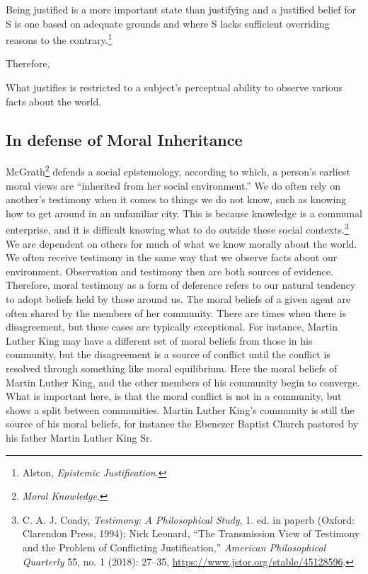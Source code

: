 \documentclass[
  12pt,
]{book}
\theoremstyle{definition}
\theoremstyle{definition}
\theoremstyle{definition}
\theoremstyle{definition}
\theoremstyle{remark}
\begin{document}
Being justified is a more important state than justifying and a justified belief for S is one based on adequate grounds and where S lacks sufficient overriding reasons to the contrary.\footnote{Alston, \emph{Epistemic Justification}.}

Therefore,

What justifies is restricted to a subject's perceptual ability to observe various facts about the world.

\subsection*{In defense of Moral Inheritance}\label{in-defense-of-moral-inheritance}

McGrath\footnote{\emph{Moral {Knowledge}}.} defends a social epistemology, according to which, a person's earliest moral views are ``inherited from her social environment.'' We do often rely on another's testimony when it comes to things we do not know, such as knowing how to get around in an unfamiliar city. This is because knowledge is a communal enterprise, and it is difficult knowing what to do outside these social contexts.\footnote{C. A. J. Coady, \emph{Testimony: A Philosophical Study}, 1. ed. in paperb (Oxford: Clarendon Press, 1994); Nick Leonard, {``The {Transmission View} of {Testimony} and the {Problem} of {Conflicting Justification},''} \emph{American Philosophical Quarterly} 55, no. 1 (2018): 27--35, \url{https://www.jstor.org/stable/45128596}.} We are dependent on others for much of what we know morally about the world. We often receive testimony in the same way that we observe facts about our environment. Observation and testimony then are both sources of evidence. Therefore, moral testimony as a form of deference refers to our natural tendency to adopt beliefs held by those around us. The moral beliefs of a given agent are often shared by the members of her community. There are times when there is disagreement, but these cases are typically exceptional. For instance, Martin Luther King may have a different set of moral beliefs from those in his community, but the disagreement is a source of conflict until the conflict is resolved through something like moral equilibrium. Here the moral beliefs of Martin Luther King, and the other members of his community begin to converge. What is important here, is that the moral conflict is not in a community, but shows a split between communities. Martin Luther King's community is still the source of his moral beliefs, for instance the Ebenezer Baptist Church pastored by his father Martin Luther King Sr.
\end{document}
